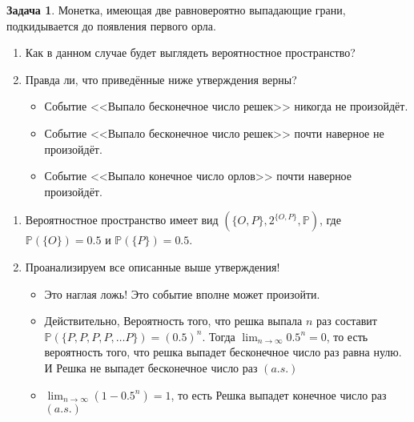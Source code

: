 \documentclass[pdftex, 12pt, a4paper]{article}
\def \mbb{\mathbb}
\def \PP{\mbb{P}}
\renewcommand{\to}{\rightarrow}
\theoremstyle{definition} %
\newtheorem{problem}{Задача}
\numberwithin{problem}{section}
\numberwithin{blits}{section}
\begin{document}
\begin{problem}
Монетка, имеющая две равновероятно выпадающие грани, подкидывается до появления первого орла. 

\begin{enumerate}
\item Как в данном случае будет выглядеть вероятностное пространство?
\item Правда ли, что приведённые ниже утверждения верны?
\begin{itemize}
\item Событие <<Выпало бесконечное число решек>> никогда не произойдёт.

\item Событие <<Выпало бесконечное число решек>> почти наверное не произойдёт.

\item Событие <<Выпало конечное число орлов>> почти наверное произойдёт.


\end{itemize}
\end{enumerate} 

\begin{sol}
\begin{enumerate}
\item Вероятностное пространство имеет вид $(\{O,P\}, 2^{\{O,P\}}, \PP)$, где $\PP(\{O\}) = 0.5$ и $\PP(\{P\})=0.5$. 

\item Проанализируем все описанные выше утверждения!
\begin{itemize}
\item  Это наглая ложь! Это событие вполне может произойти.

\item  Действительно, Вероятность того, что решка выпала $n$ раз составит $\PP(\{P, P, P, P, \ldots P\}) = (0.5)^{n}$. Тогда $\displaystyle \lim_{n \to \infty} 0.5^{n} = 0$, то есть вероятность того, что решка выпадет бесконечное число раз равна нулю. И Решка не выпадет бесконечное число раз $(a.s.)$   

\item $\displaystyle \lim_{n \to \infty} (1 - 0.5^n) = 1$, то есть Решка выпадет конечное число раз $(a.s.)$
\end{itemize}
\end{enumerate}
\end{sol}
\end{problem}
\end{document}
